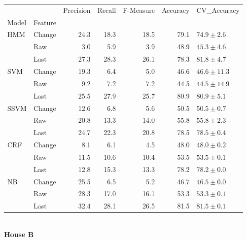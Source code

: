 \documentclass{article}
\begin{document}
\begin{tabular}{llrrrrl}
\toprule
    &        &  Precision &  Recall &  F-Measure &  Accuracy &    CV\_Accuracy \\
Model & Feature &            &         &            &           &                \\
\midrule
HMM & Change &       24.3 &    18.3 &       18.5 &      79.1 &   $74.9\pm2.6$ \\
    & Raw &        3.0 &     5.9 &        3.9 &      48.9 &   $45.3\pm4.6$ \\
    & Last &       27.3 &    28.3 &       26.1 &      78.3 &   $81.8\pm4.7$ \\
SVM & Change &       19.3 &     6.4 &        5.0 &      46.6 &  $46.6\pm11.3$ \\
    & Raw &        9.2 &     7.2 &        7.2 &      44.5 &  $44.5\pm14.9$ \\
    & Last &       25.5 &    27.9 &       25.7 &      80.9 &   $80.9\pm5.1$ \\
SSVM & Change &       12.6 &     6.8 &        5.6 &      50.5 &   $50.5\pm0.7$ \\
    & Raw &       20.8 &    13.3 &       14.0 &      55.8 &   $55.8\pm2.3$ \\
    & Last &       24.7 &    22.3 &       20.8 &      78.5 &   $78.5\pm0.4$ \\
CRF & Change &        8.1 &     6.1 &        4.5 &      48.0 &   $48.0\pm0.2$ \\
    & Raw &       11.5 &    10.6 &       10.4 &      53.5 &   $53.5\pm0.1$ \\
    & Last &       12.8 &    15.3 &       13.3 &      78.2 &   $78.2\pm0.0$ \\
NB & Change &       25.5 &     6.5 &        5.2 &      46.7 &   $46.5\pm0.0$ \\
    & Raw &       28.3 &    17.0 &       16.1 &      53.3 &   $53.3\pm0.1$ \\
    & Last &       32.4 &    28.1 &       26.5 &      81.5 &   $81.5\pm0.1$ \\
\bottomrule
\end{tabular}
\vspace{1cm}\\
\textbf{House B}\\
\vspace{1cm}\\
\end{document}
